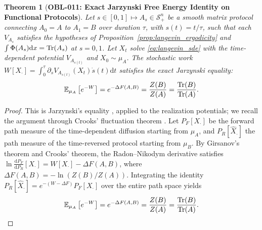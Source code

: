 \documentclass[11pt,a4paper,reqno]{amsart}
\newtheorem{theorem}{Theorem}[section]
\theoremstyle{definition}
\theoremstyle{remark}
\numberwithin{equation}{section}
\newcommand{\dif}{\mathrm{d}}
\begin{document}
\begin{theorem}[\textbf{OBL-011: Exact Jarzynski Free Energy Identity on Functional Protocols}]
\label{thm:jarzynski_identity}
Let $s \in [0, 1] \mapsto A_s \in \mathcal{S}_+^n$ be a smooth matrix protocol connecting $A_0 = A$ to $A_1 = B$ over duration $\tau$, with $s(t) = t/\tau$, such that each $V_{A_s}$ satisfies the hypotheses of Proposition~\ref{prop:langevin_ergodicity} and $\int\Phi(A_s)\dif x = \Tr(A_s)$ at $s = 0, 1$. Let $X_t$ solve \eqref{eq:langevin_sde} with the time-dependent potential $V_{A_{s(t)}}$ and $X_0 \sim \mu_A$. The stochastic work $W[X_\cdot] = \int_0^\tau \partial_s V_{A_{s(t)}}(X_t) \dot{s}(t) \dif t$ satisfies the exact Jarzynski equality:
\begin{equation}
\mathbb{E}_{\mu_A} \left[ e^{-W} \right] = e^{-\Delta F(A, B)} = \frac{Z(B)}{Z(A)} = \frac{\Tr(B)}{\Tr(A)}.
\end{equation}
\end{theorem}

\begin{proof}
This is Jarzynski's equality \cite{Jarzynski1997}, applied to the realization potentials; we recall the argument through Crooks' fluctuation theorem \cite{Crooks1999}. Let $P_F[X_\cdot]$ be the forward path measure of the time-dependent diffusion starting from $\mu_A$, and $P_R[\hat{X}_\cdot]$ the path measure of the time-reversed protocol starting from $\mu_B$. By Girsanov's theorem and Crooks' theorem, the Radon--Nikodym derivative satisfies $\ln \frac{\dif P_F}{\dif P_R}[X_\cdot] = W[X_\cdot] - \Delta F(A, B)$, where $\Delta F(A, B) = -\ln(Z(B)/Z(A))$. Integrating the identity $P_R[\hat{X}_\cdot] = e^{-(W - \Delta F)} P_F[X_\cdot]$ over the entire path space yields
\begin{equation}
\mathbb{E}_{\mu_A} \left[ e^{-W} \right] = e^{-\Delta F(A, B)} = \frac{Z(B)}{Z(A)} = \frac{\Tr(B)}{\Tr(A)}.
\end{equation}
\end{proof}
\end{document}

